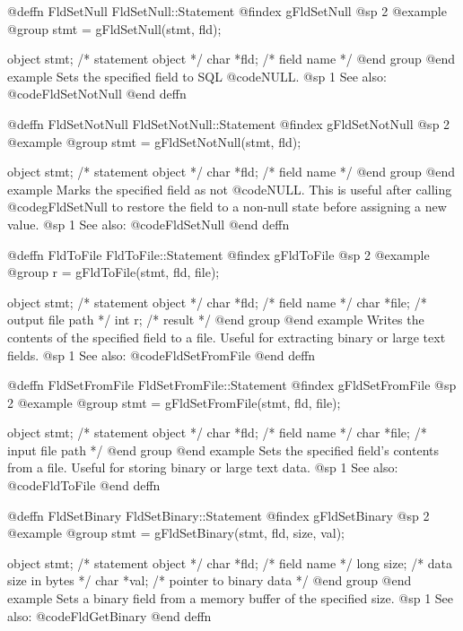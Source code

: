 @deffn {FldSetNull} FldSetNull::Statement
@findex gFldSetNull
@sp 2
@example
@group
stmt = gFldSetNull(stmt, fld);

object  stmt;   /*  statement object  */
char    *fld;   /*  field name        */
@end group
@end example
Sets the specified field to SQL @code{NULL}.
@sp 1
See also:  @code{FldSetNotNull}
@end deffn



@deffn {FldSetNotNull} FldSetNotNull::Statement
@findex gFldSetNotNull
@sp 2
@example
@group
stmt = gFldSetNotNull(stmt, fld);

object  stmt;   /*  statement object  */
char    *fld;   /*  field name        */
@end group
@end example
Marks the specified field as not @code{NULL}.  This is useful after
calling @code{gFldSetNull} to restore the field to a non-null state
before assigning a new value.
@sp 1
See also:  @code{FldSetNull}
@end deffn



@deffn {FldToFile} FldToFile::Statement
@findex gFldToFile
@sp 2
@example
@group
r = gFldToFile(stmt, fld, file);

object  stmt;   /*  statement object  */
char    *fld;   /*  field name        */
char    *file;  /*  output file path  */
int     r;      /*  result            */
@end group
@end example
Writes the contents of the specified field to a file.  Useful for
extracting binary or large text fields.
@sp 1
See also:  @code{FldSetFromFile}
@end deffn



@deffn {FldSetFromFile} FldSetFromFile::Statement
@findex gFldSetFromFile
@sp 2
@example
@group
stmt = gFldSetFromFile(stmt, fld, file);

object  stmt;   /*  statement object  */
char    *fld;   /*  field name        */
char    *file;  /*  input file path   */
@end group
@end example
Sets the specified field's contents from a file.  Useful for storing
binary or large text data.
@sp 1
See also:  @code{FldToFile}
@end deffn



@deffn {FldSetBinary} FldSetBinary::Statement
@findex gFldSetBinary
@sp 2
@example
@group
stmt = gFldSetBinary(stmt, fld, size, val);

object  stmt;   /*  statement object       */
char    *fld;   /*  field name             */
long    size;   /*  data size in bytes     */
char    *val;   /*  pointer to binary data */
@end group
@end example
Sets a binary field from a memory buffer of the specified size.
@sp 1
See also:  @code{FldGetBinary}
@end deffn



